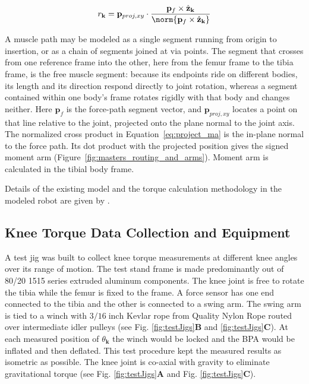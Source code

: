 \begin{equation}
    r_{\mathbf{k}} = \mathbf{p}_{proj,xy} \cdot \frac{\mathbf{p}_{f} \times \hat{\mathbf{z}}_{\mathbf{k}}} { \norm{\mathbf{p}_{f} \times \hat{\mathbf{z}}_{\mathbf{k}}} } \label{eq:project_ma}
\end{equation}

A muscle path may be modeled as a single segment running from origin to insertion, or as a chain of segments joined at via points. The segment that crosses from one reference frame into the other, here from the femur frame to the tibia frame, is the free muscle segment: because its endpoints ride on different bodies, its length and its direction respond directly to joint rotation, whereas a segment contained within one body's frame rotates rigidly with that body and changes neither. Here $\mathbf{p}_{f}$ is the force-path segment vector, and $\mathbf{p}_{proj,xy}$ locates a point on that line relative to the joint, projected onto the plane normal to the joint axis. The normalized cross product in Equation~\eqref{eq:project_ma} is the in-plane normal to the force path. Its dot product with the projected position gives the signed moment arm (Figure~\ref{fig:masters_routing_and_arms}). Moment arm is calculated in the tibial body frame.

Details of the existing model and the torque calculation methodology in the modeled robot are given by \citet{bolen_determination_2019, morrow_optimization_2020}.

\subsection{Knee Torque Data Collection and Equipment}\label{sec:torque_equipment}


A test jig was built to collect knee torque measurements at different knee angles over its range of motion. The test stand frame is made predominantly out of 80/20 1515 series extruded aluminum components. The knee joint is free to rotate the tibia while the femur is fixed to the frame. A force sensor has one end connected to the tibia and the other is connected to a swing arm. The swing arm is tied to a winch with $3/16\; \text{inch}$ Kevlar rope from Quality Nylon Rope routed over intermediate idler pulleys (see Fig. \ref{fig:testJigs}\textbf{B} and \ref{fig:testJigs}\textbf{C}). At each measured position of $\theta_{\mathbf{k}}$ the winch would be locked and the BPA would be inflated and then deflated. This test procedure kept the measured results as isometric as possible.  The knee joint is co-axial with gravity to eliminate gravitational torque (see Fig. \ref{fig:testJigs}\textbf{A} and Fig. \ref{fig:testJigs}\textbf{C}).

